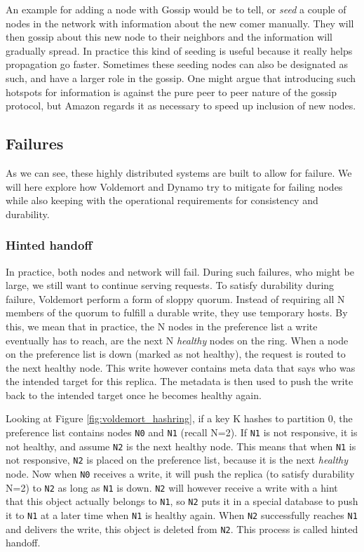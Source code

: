 \begin{itemize}
An example for adding a node with Gossip would be to tell, or \emph{seed} a couple of nodes in the network with information about the new comer manually. They will then gossip about this new node to their neighbors and the information will gradually spread. In practice this kind of seeding is useful because it really helps propagation go faster. Sometimes these seeding nodes can also be designated as such, and have a larger role in the gossip. One might argue that introducing such hotspots for information is against the pure peer to peer nature of the gossip protocol, but Amazon regards it as necessary to speed up inclusion of new nodes.

\end{itemize}

\subsection{Failures}
\label{sec:failures}
As we can see, these highly distributed systems are built to allow for failure. We will here explore how Voldemort and Dynamo try to mitigate for failing nodes while also keeping with the operational requirements for consistency and durability. 

\subsubsection{Hinted handoff}
In practice, both nodes and network will fail. During such failures, who might be large, we still want to continue serving requests.
To satisfy durability during failure, Voldemort perform a form of sloppy quorum. 
Instead of requiring all N members of the quorum to fulfill a durable write, they use temporary hosts. 
By this, we mean that in practice, the N nodes in the preference list a write eventually has to reach, are the next N \emph{healthy} nodes on the ring.
When a node on the preference list is down (marked as not healthy), the request is routed to the next healthy node. 
This write however contains meta data that says who was the intended target for this replica. 
The metadata is then used to push the write back to the intended target once he becomes healthy again.

Looking at Figure \ref{fig:voldemort_hashring}, if a key K hashes to partition 0, the preference list contains nodes \texttt{N0} and \texttt{N1} (recall N=2).
If \texttt{N1} is not responsive, it is not healthy, and assume \texttt{N2} is the next healthy node.
This means that when \texttt{N1} is not responsive, \texttt{N2} is placed on the preference list, because it is the next \emph{healthy} node.
Now when \texttt{N0} receives a write, it will push the replica (to satisfy durability N=2) to \texttt{N2} as long as \texttt{N1} is down.
\texttt{N2} will however receive a write with a hint that this object actually belongs to \texttt{N1}, so \texttt{N2} puts it in a special database to push it to \texttt{N1} at a later time when \texttt{N1} is healthy again. When \texttt{N2} successfully reaches \texttt{N1} and delivers the write, this object is deleted from \texttt{N2}. 
This process is called hinted handoff. 

